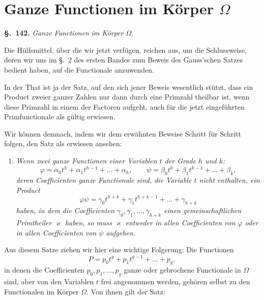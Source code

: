 \documentclass[12pt,a4paper]{article}
\theoremstyle{definition}
\begin{document}
\newpage
\section{Ganze Functionen im Körper $\Omega$}\label{sec:142}

\noindent\textbf{\S.~142.}\quad
\textit{Ganze Functionen im Körper $\Omega$.}\par\medskip

Die Hülfsmittel, über die wir jetzt verfügen, reichen aus, um die Schlussweise, deren wir uns im \S.~2 des ersten Bandes zum Beweis des Gauss'schen Satzes bedient haben, auf die Functionale anzuwenden.

In der That ist ja der Satz, auf den sich jener Beweis wesentlich stützt, dass ein Product zweier ganzer Zahlen nur dann durch eine Primzahl theilbar ist, wenn diese Primzahl in einem der Factoren aufgeht, auch für die jetzt eingeführten Primfunctionale als gültig erwiesen.

Wir können demnach, indem wir dem erwähnten Beweise Schritt für Schritt folgen, den Satz als erwiesen ansehen:

\begin{enumerate}[label=\arabic*.]
\item \textit{Wenn zwei ganze Functionen einer Variablen $t$ der Grade $h$ und $k$:}
\[
\varphi = \alpha_0 t^h + \alpha_1 t^{h-1} + \dots + \alpha_h,\qquad
\psi = \beta_0 t^k + \beta_1 t^{k-1} + \dots + \beta_k,
\]
\textit{deren Coefficienten ganze Functionale sind, die Variable $t$ nicht enthalten, ein Product}
\[
\varphi\psi = \gamma_0 t^{h+k} + \gamma_1 t^{h+k-1} + \dots + \gamma_{h+k}
\]
\textit{haben, in dem die Coefficienten $\gamma_0,\gamma_1,\dots,\gamma_{h+k}$ einen gemeinschaftlichen Primtheiler $\varkappa$ haben, so muss $\varkappa$ entweder in allen Coefficienten von $\varphi$ oder in allen Coefficienten von $\psi$ aufgehen.}
\end{enumerate}

Aus diesem Satze ziehen wir hier eine wichtige Folgerung:
Die Functionen
\begin{equation}\label{eq:142-1}
P = p_0 t^g + p_1 t^{g-1} + \dots + p_g,
\end{equation}
in denen die Coefficienten $p_0,p_1,\dots,p_g$ ganze oder gebrochene Functionale in $\Omega$ sind, aber von den Variablen $t$ frei angenommen werden, gehören selbst zu den Functionalen im Körper $\Omega$. Von ihnen gilt der Satz:
\end{document}
